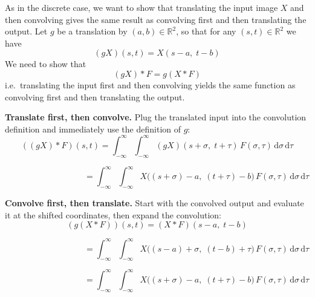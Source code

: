 \documentclass[12pt]{article}
\begin{document}
  As in the discrete case, we want to show that translating the input image $X$
  and then convolving gives the same result as convolving first and then
  translating the output. Let $g$ be a translation by $(a,b) \in \mathbb{R}^2$,
  so that for any $(s,t) \in \mathbb{R}^2$ we have
  \begin{equation}
    (g X)(s,t) = X(s - a,\; t - b)
  \end{equation}
  We need to show that
  \[
  (g X) * F = g (X * F)
  \]
  i.e.\ translating the input first and then convolving yields the same function
  as convolving first and then translating the output.
  
  \textbf{Translate first, then convolve.}
  Plug the translated input into the convolution definition and immediately use
  the definition of $g$:
  \begin{equation}
    \label{eq:continuous-eq1}
    ((g X) * F)(s,t)
      = \int_{-\infty}^{\infty}\!\!\int_{-\infty}^{\infty}
         (g X)(s + \sigma,\; t + \tau)\,
         F(\sigma,\tau)\,\mathrm{d}\sigma\,\mathrm{d}\tau
    \end{equation}
    
    \begin{equation}
    \label{eq:continuous-eq2}
    \phantom{((g X) * F)(s,t)}
      = \int_{-\infty}^{\infty}\!\!\int_{-\infty}^{\infty}
         X\bigl((s + \sigma) - a,\; (t + \tau) - b\bigr)\,
         F(\sigma,\tau)\,\mathrm{d}\sigma\,\mathrm{d}\tau
    \end{equation}
    

  \textbf{Convolve first, then translate.}
  Start with the convolved output and evaluate it at the shifted coordinates,
  then expand the convolution:
  \begin{equation}
    \label{eq:continuous-eq3}
    (g (X * F))(s,t)
      = (X * F)(s - a,\; t - b)
    \end{equation}
    
    \begin{equation}
    \label{eq:continuous-eq4}
    \phantom{(g (X * F))(s,t)}
      = \int_{-\infty}^{\infty}\!\!\int_{-\infty}^{\infty}
         X\bigl((s - a) + \sigma,\; (t - b) + \tau\bigr)\,
         F(\sigma,\tau)\,\mathrm{d}\sigma\,\mathrm{d}\tau
    \end{equation}
    
    \begin{equation}
    \label{eq:continuous-eq5}
    \phantom{(g (X * F))(s,t)}
      = \int_{-\infty}^{\infty}\!\!\int_{-\infty}^{\infty}
         X\bigl((s + \sigma) - a,\; (t + \tau) - b\bigr)\,
         F(\sigma,\tau)\,\mathrm{d}\sigma\,\mathrm{d}\tau
    \end{equation}
    
\end{document}
